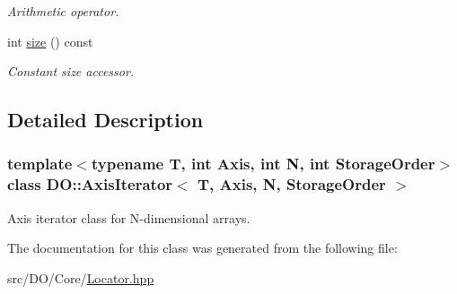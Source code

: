 \begin{DoxyCompactItemize}
\begin{DoxyCompactList}\small\item\em Arithmetic operator. \end{DoxyCompactList}\item 
\hypertarget{class_d_o_1_1_axis_iterator_ab8e4e3e2a7bf18888b71bdf9dda0770b}{int \hyperlink{class_d_o_1_1_axis_iterator_ab8e4e3e2a7bf18888b71bdf9dda0770b}{size} () const }\label{class_d_o_1_1_axis_iterator_ab8e4e3e2a7bf18888b71bdf9dda0770b}

\begin{DoxyCompactList}\small\item\em Constant size accessor. \end{DoxyCompactList}\end{DoxyCompactItemize}


\subsection{Detailed Description}
\subsubsection*{template$<$typename T, int Axis, int N, int Storage\-Order$>$class D\-O\-::\-Axis\-Iterator$<$ T, Axis, N, Storage\-Order $>$}

Axis iterator class for N-\/dimensional arrays. 

The documentation for this class was generated from the following file\-:\begin{DoxyCompactItemize}
\item 
src/\-D\-O/\-Core/\hyperlink{_locator_8hpp}{Locator.\-hpp}\end{DoxyCompactItemize}
